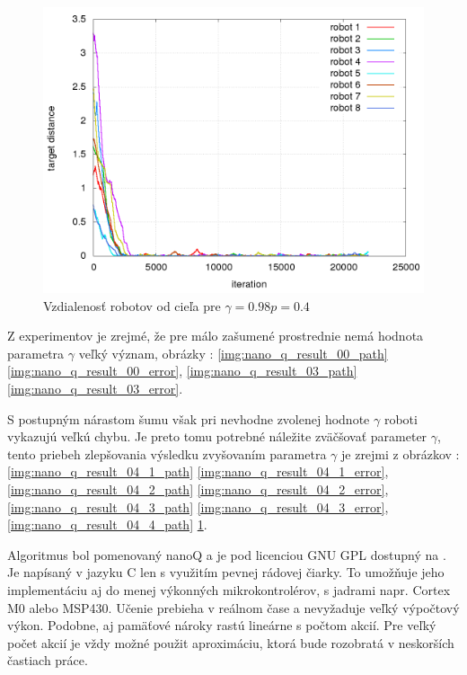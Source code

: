 \begin{figure}[!htb]
\centering
\includegraphics[scale=.4]{../../results_q_learning/nano_q_learning/result_04_04/robot_reward.png}
\caption{Vzdialenosť robotov od cieľa pre $\gamma = 0.98 p = 0.4$}
\label{img:nano_q_result_04_4_error}
\end{figure}

Z experimentov je zrejmé, že pre málo zašumené prostrednie nemá hodnota parametra
$\gamma$ veľký význam, obrázky :
\ref{img:nano_q_result_00_path}
\ref{img:nano_q_result_00_error},
\ref{img:nano_q_result_03_path}
\ref{img:nano_q_result_03_error}.

S postupným nárastom šumu však pri nevhodne zvolenej hodnote $\gamma$
roboti vykazujú veľkú chybu. Je preto tomu potrebné náležite zväčšovať
parameter $\gamma$, tento priebeh zlepšovania výsledku zvyšovaním parametra $\gamma$
je zrejmi z obrázkov :
\ref{img:nano_q_result_04_1_path}
\ref{img:nano_q_result_04_1_error},
\ref{img:nano_q_result_04_2_path}
\ref{img:nano_q_result_04_2_error},
\ref{img:nano_q_result_04_3_path}
\ref{img:nano_q_result_04_3_error},
\ref{img:nano_q_result_04_4_path}
\ref{img:nano_q_result_04_4_error}.

Algoritmus bol pomenovaný nanoQ a je pod licenciou GNU GPL dostupný na \cite{bib:nano_q_link}.
Je napísaný v jazyku C len s využitím pevnej rádovej čiarky. To umožňuje jeho implementáciu
aj do menej výkonných mikrokontrolérov, s jadrami napr. Cortex M0 alebo MSP430. Učenie
prebieha v reálnom čase a nevyžaduje veľký výpočtový výkon. Podobne, aj pamäťové nároky rastú
lineárne s počtom akcií. Pre veľký počet akcií je vždy možné použit aproximáciu, ktorá bude rozobratá
v neskorších častiach práce.

